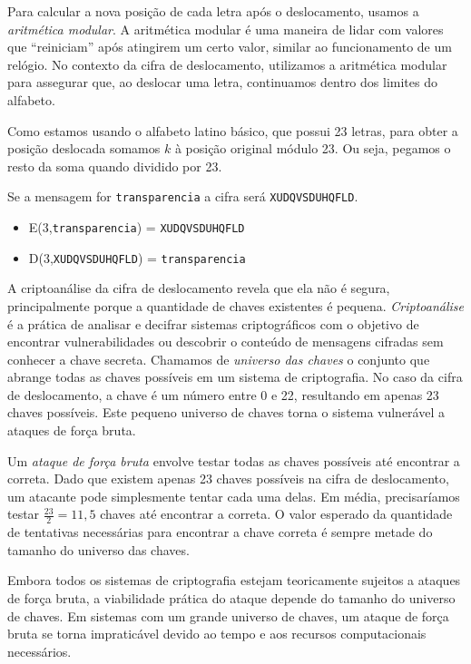 \begin{example}
Para calcular a nova posição de cada letra após o deslocamento, usamos a {\em aritmética modular}.
A aritmética modular é uma maneira de lidar com valores que ``reiniciam'' após atingirem um certo valor, similar ao funcionamento de um relógio.
No contexto da cifra de deslocamento, utilizamos a aritmética modular para assegurar que, ao deslocar uma letra, continuamos dentro dos limites do alfabeto.

Como estamos usando o alfabeto latino básico, que possui 23 letras, para obter a posição deslocada somamos $k$ à posição original módulo 23.
Ou seja, pegamos o resto da soma quando dividido por 23.  

Se a mensagem for {\tt transparencia} a cifra será {\tt XUDQVSDUHQFLD}.

  \begin{itemize}
  \item E($3$,{\tt transparencia}) =  {\tt XUDQVSDUHQFLD} 
  \item D($3$,{\tt XUDQVSDUHQFLD}) =  {\tt transparencia} 
  \end{itemize}
\end{example}

A criptoanálise da cifra de deslocamento revela que ela não é segura, principalmente porque a quantidade de chaves existentes é pequena.
{\em Criptoanálise} é a prática de analisar e decifrar sistemas criptográficos com o objetivo de encontrar vulnerabilidades ou descobrir o conteúdo de mensagens cifradas sem conhecer a chave secreta.
Chamamos de {\em universo das chaves} o conjunto que abrange todas as chaves possíveis em um sistema de criptografia.
No caso da cifra de deslocamento, a chave é um número entre 0 e 22, resultando em apenas 23 chaves possíveis.
Este pequeno universo de chaves torna o sistema vulnerável a ataques de força bruta.

Um {\em ataque de força bruta} envolve testar todas as chaves possíveis até encontrar a correta.
Dado que existem apenas 23 chaves possíveis na cifra de deslocamento, um atacante pode simplesmente tentar cada uma delas.
Em média, precisaríamos testar $\frac{23}{2} =11,5$ chaves até encontrar a correta.
O valor esperado da quantidade de tentativas necessárias para encontrar a chave correta é sempre metade do tamanho do universo das chaves.

Embora todos os sistemas de criptografia estejam teoricamente sujeitos a ataques de força bruta, a viabilidade prática do ataque depende do tamanho do universo de chaves.
Em sistemas com um grande universo de chaves, um ataque de força bruta se torna impraticável devido ao tempo e aos recursos computacionais necessários.

